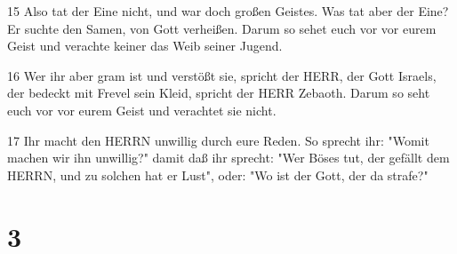 \par 15 Also tat der Eine nicht, und war doch großen Geistes. Was tat aber der Eine? Er suchte den Samen, von Gott verheißen. Darum so sehet euch vor vor eurem Geist und verachte keiner das Weib seiner Jugend.
\par 16 Wer ihr aber gram ist und verstößt sie, spricht der HERR, der Gott Israels, der bedeckt mit Frevel sein Kleid, spricht der HERR Zebaoth. Darum so seht euch vor vor eurem Geist und verachtet sie nicht.
\par 17 Ihr macht den HERRN unwillig durch eure Reden. So sprecht ihr: "Womit machen wir ihn unwillig?" damit daß ihr sprecht: "Wer Böses tut, der gefällt dem HERRN, und zu solchen hat er Lust", oder: "Wo ist der Gott, der da strafe?"

\chapter{3}

